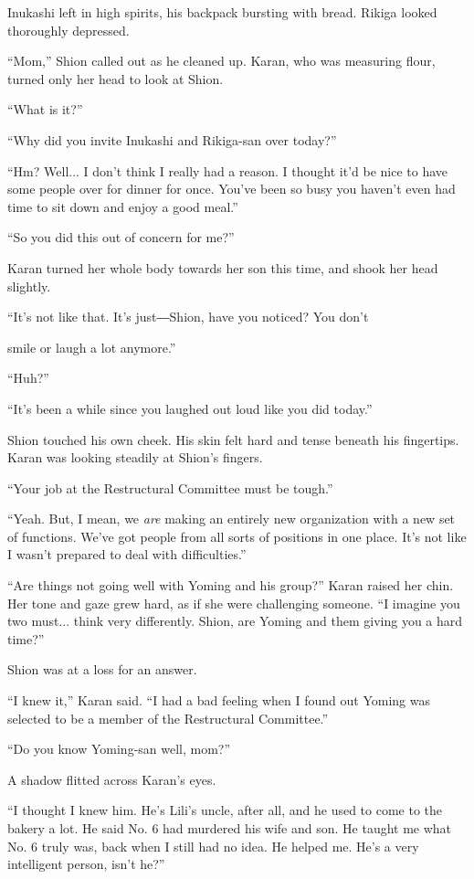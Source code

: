 Inukashi left in high spirits, his backpack bursting with bread. Rikiga
looked thoroughly depressed.

``Mom,'' Shion called out as he cleaned up. Karan, who was measuring
flour, turned only her head to look at Shion.

``What is it?''

``Why did you invite Inukashi and Rikiga-san over today?''

``Hm? Well... I don't think I really had a reason. I thought it'd be
nice to have some people over for dinner for once. You've been so busy
you haven't even had time to sit down and enjoy a good meal.''

``So you did this out of concern for me?''

Karan turned her whole body towards her son this time, and shook her
head slightly.

``It's not like that. It's just―Shion, have you noticed? You don't~

smile or laugh a lot anymore.''

``Huh?''

``It's been a while since you laughed out loud like you did today.''

Shion touched his own cheek. His skin felt hard and tense beneath his
fingertips. Karan was looking steadily at Shion's fingers.

``Your job at the Restructural Committee must be tough.''

``Yeah. But, I mean, we \emph{are} making an entirely new organization with a
new set of functions. We've got people from all sorts of positions in
one place. It's not like I wasn't prepared to deal with difficulties.''

``Are things not going well with Yoming and his group?'' Karan raised
her chin. Her tone and gaze grew hard, as if she were challenging
someone. ``I imagine you two must... think very differently. Shion, are
Yoming and them giving you a hard time?''

Shion was at a loss for an answer.

``I knew it,'' Karan said. ``I had a bad feeling when I found out Yoming
was selected to be a member of the Restructural Committee.''

``Do you know Yoming-san well, mom?''

A shadow flitted across Karan's eyes.

``I thought I knew him. He's Lili's uncle, after all, and he used to
come to the bakery a lot. He said No. 6 had murdered his wife and son.
He taught me what No. 6 truly was, back when I still had no idea. He
helped me. He's a very intelligent person, isn't he?''

